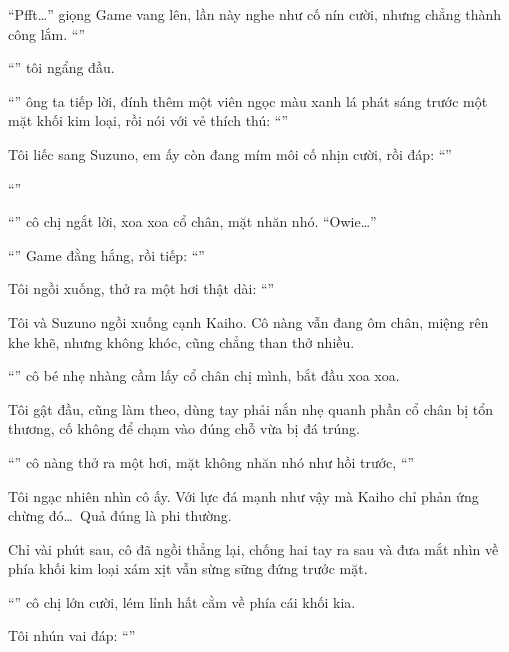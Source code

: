 \documentclass[../main.tex]{subfiles}
\begin{document}
``Pfft\dots'' giọng Game vang lên, lần này nghe như cố nín cười, nhưng chẳng thành công lắm. ``''

``'' tôi ngẩng đầu.

``'' ông ta tiếp lời, đính thêm một viên ngọc màu xanh lá phát sáng trước một mặt khối kim loại, rồi nói với vẻ thích thú: ``''


Tôi liếc sang Suzuno, em ấy còn đang mím môi cố nhịn cười, rồi đáp: ``''

``''

``'' cô chị ngắt lời, xoa xoa cổ chân, mặt nhăn nhó. ``Owie\dots''

``'' Game đằng hắng, rồi tiếp: ``''

Tôi ngồi xuống, thở ra một hơi thật dài: ``''

\ct

Tôi và Suzuno ngồi xuống cạnh Kaiho. Cô nàng vẫn đang ôm chân, miệng rên khe khẽ, nhưng không khóc, cũng chẳng than thở nhiều.

``'' cô bé nhẹ nhàng cầm lấy cổ chân chị mình, bắt đầu xoa xoa.

Tôi gật đầu, cũng làm theo, dùng tay phải nắn nhẹ quanh phần cổ chân bị tổn thương, cố không để chạm vào đúng chỗ vừa bị đá trúng.

``'' cô nàng thở ra một hơi, mặt không nhăn nhó như hồi trước, ``''

Tôi ngạc nhiên nhìn cô ấy. Với lực đá mạnh như vậy mà Kaiho chỉ phản ứng chừng đó\dots\ Quả đúng là phi thường.

Chỉ vài phút sau, cô đã ngồi thẳng lại, chống hai tay ra sau và đưa mắt nhìn về phía khối kim loại xám xịt vẫn sừng sững đứng trước mặt.

``'' cô chị lớn cười, lém lỉnh hất cằm về phía cái khối kia.

Tôi nhún vai đáp: ``''
\end{document}
